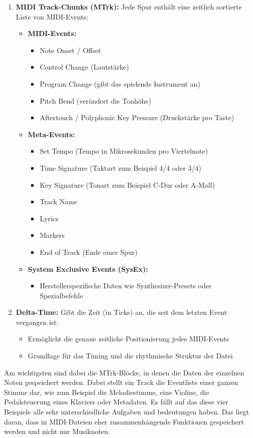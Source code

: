 \begin{enumerate}
    \item \textbf{MIDI Track-Chunks (MTrk):} Jede Spur enthält eine zeitlich sortierte Liste von MIDI-Events:
    \begin{itemize}
        \item \textbf{MIDI-Events:}
        \begin{itemize}
            \item Note Onset / Offset
            \item Control Change (Lautstärke)
            \item Program Change (gibt das spielende Instrument an)
            \item Pitch Bend (verändert die Tonhöhe)
            \item Aftertouch / Polyphonic Key Pressure (Druckstärke pro Taste)
        \end{itemize}
        \item \textbf{Meta-Events:}
        \begin{itemize}
            \item Set Tempo (Tempo in Mikrosekunden pro Viertelnote)
            \item Time Signature (Taktart zum Beispiel 4/4 oder 3/4)
            \item Key Signature (Tonart zum Beispiel C-Dur oder A-Moll)
            \item Track Name
            \item Lyrics
            \item Markers
            \item End of Track (Ende einer Spur)
        \end{itemize}
        \item \textbf{System Exclusive Events (SysEx):}
        \begin{itemize}
            \item Herstellerspezifische Daten wie Synthesizer-Presets oder Spezialbefehle
        \end{itemize}
    \end{itemize}

    \item \textbf{Delta-Time:} Gibt die Zeit (in Ticks) an, die seit dem letzten Event vergangen ist:
    \begin{itemize}
        \item Ermöglicht die genaue zeitliche Positionierung jedes MIDI-Events
        \item Grundlage für das Timing und die rhythmische Struktur der Datei
    \end{itemize}
\end{enumerate}
Am wichtigsten sind dabei die MTrk-Blöcke, in denen die Daten der einzelnen Noten gespeichert werden.
Dabei stellt ein Track die Eventliste einer ganzen Stimme dar,
wie zum Beispiel die Melodiestimme, eine Violine, die Pedalsteuerung eines Klaviers oder Metadaten.
Es fällt auf das diese vier Beispiele alle sehr unterschiedliche Aufgaben und bedeutungen haben.
Das liegt daran, dass in MIDI-Dateien eher zusammenhängende Funktionen gespeichert werden und nicht nur Musiknoten.

